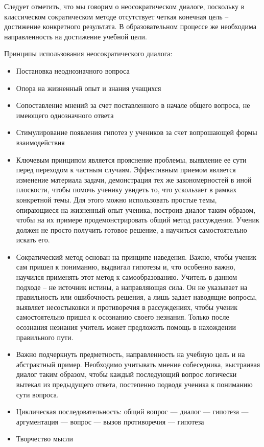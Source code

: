 \documentclass[a4paper,14pt,russian]{extreport}
\begin{document}
Следует отметить, что мы говорим о неосократическом диалоге, поскольку в классическом сократическом методе отсутствует четкая конечная цель – достижение конкретного результата. В образовательном процессе же необходима направленность на достижение учебной цели.

\begin{center}
Принципы использования неосократического диалога:
\end{center}

\begin{itemize}

\item	Постановка неоднозначного вопроса
\item	Опора на жизненный опыт и знания учащихся
\item	Сопоставление мнений за счет поставленного в начале общего вопроса, не имеющего однозначного ответа
\item	Стимулирование появления гипотез у учеников за счет вопрошающей формы взаимодействия
\item	Ключевым принципом является прояснение проблемы, выявление ее сути перед переходом к частным случаям. Эффективным приемом является изменение материала задачи, демонстрация тех же закономерностей в иной плоскости, чтобы помочь ученику увидеть то, что ускользает в рамках конкретной темы. Для этого можно использовать простые темы, опирающиеся на жизненный опыт ученика, построив диалог таким образом, чтобы на их примере продемонстрировать общий метод рассуждения. Ученик должен не просто получить готовое решение, а научиться самостоятельно искать его.
\item	Сократический метод основан на принципе наведения. Важно, чтобы ученик сам пришел к пониманию, выдвигал гипотезы и, что особенно важно, научился применять этот метод к самообразованию. Учитель в данном подходе – не источник истины, а направляющая сила. Он не указывает на правильность или ошибочность решения, а лишь задает наводящие вопросы, выявляет несостыковки и противоречия в рассуждениях, чтобы ученик самостоятельно пришел к осознанию своего незнания. Только после осознания незнания учитель может предложить помощь в нахождении правильного пути.
\item	Важно подчеркнуть предметность, направленность на учебную цель и на абстрактный пример. Необходимо учитывать мнение собеседника, выстраивая диалог таким образом, чтобы каждый последующий вопрос логически вытекал из предыдущего ответа, постепенно подводя ученика к пониманию сути вопроса.
\item	Циклическая последовательность: общий вопрос — диалог — гипотеза — аргументация — вопрос — вызов противоречия — гипотеза
\item	Творчество мысли

\end{itemize}
\end{document}
